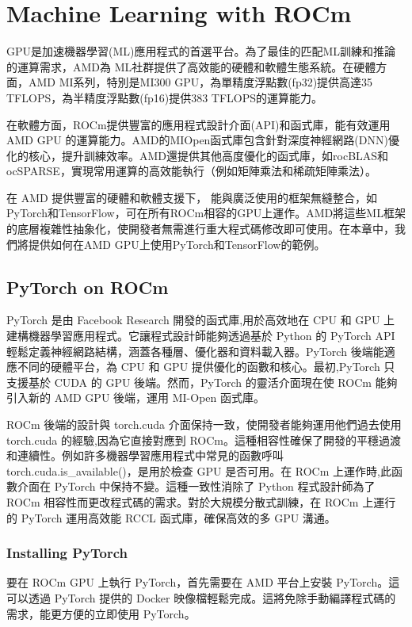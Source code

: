 \chapter{Machine Learning with ROCm}

GPU是加速機器學習(ML)應用程式的首選平台。為了最佳的匹配ML訓練和推論的運算需求，AMD為 ML社群提供了高效能的硬體和軟體生態系統。在硬體方面，AMD MI系列，特別是MI300 GPU，為單精度浮點數(fp32)提供高達35 TFLOPS，為半精度浮點數(fp16)提供383 TFLOPS的運算能力。

在軟體方面，ROCm提供豐富的應用程式設計介面(API)和函式庫，能有效運用 AMD GPU 的運算能力。AMD的MIOpen函式庫包含針對深度神經網路(DNN)優化的核心，提升訓練效率。AMD還提供其他高度優化的函式庫，如rocBLAS和 ocSPARSE，實現常用運算的高效能執行（例如矩陣乘法和稀疏矩陣乘法）。

在 AMD 提供豐富的硬體和軟體支援下， 能與廣泛使用的框架無縫整合，如PyTorch和TensorFlow，可在所有ROCm相容的GPU上運作。AMD將這些ML框架的底層複雜性抽象化，使開發者無需進行重大程式碼修改即可使用。在本章中，我們將提供如何在AMD GPU上使用PyTorch和TensorFlow的範例。

\section{PyTorch on ROCm}

PyTorch 是由 Facebook Research 開發的函式庫,用於高效地在 CPU 和 GPU 上建構機器學習應用程式。它讓程式設計師能夠透過基於 Python 的 PyTorch API 輕鬆定義神經網路結構，涵蓋各種層、優化器和資料載入器。PyTorch 後端能適應不同的硬體平台，為 CPU 和 GPU 提供優化的函數和核心。最初,PyTorch 只支援基於 CUDA 的 GPU 後端。然而，PyTorch 的靈活介面現在使 ROCm 能夠引入新的 AMD GPU 後端，運用 MI-Open 函式庫。

ROCm 後端的設計與 torch.cuda 介面保持一致，使開發者能夠運用他們過去使用 torch.cuda 的經驗,因為它直接對應到 ROCm。這種相容性確保了開發的平穩過渡和連續性。例如許多機器學習應用程式中常見的函數呼叫 torch.cuda.is\_available()，是用於檢查 GPU 是否可用。在 ROCm 上運作時,此函數介面在 PyTorch 中保持不變。這種一致性消除了 Python 程式設計師為了 ROCm 相容性而更改程式碼的需求。對於大規模分散式訓練，在 ROCm 上運行的 PyTorch 運用高效能 RCCL 函式庫，確保高效的多 GPU 溝通。

\subsection{Installing PyTorch}

要在 ROCm GPU 上執行 PyTorch，首先需要在 AMD 平台上安裝 PyTorch。這可以透過 PyTorch 提供的 Docker 映像檔輕鬆完成。這將免除手動編譯程式碼的需求，能更方便的立即使用 PyTorch。

